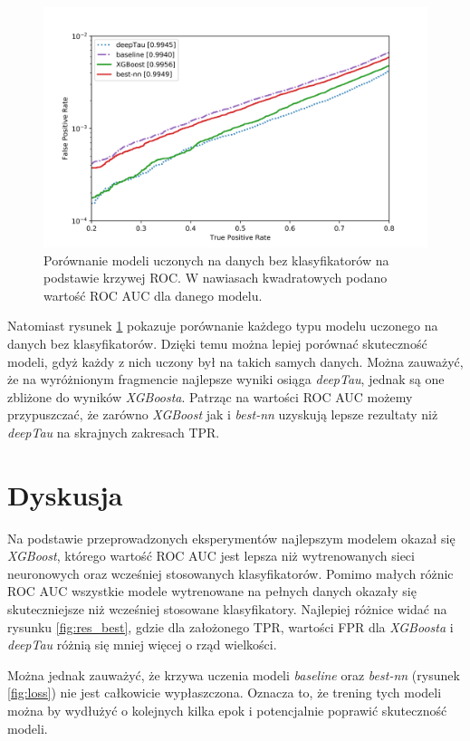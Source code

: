 \documentclass{pracalicmgr}
\begin{document}
	\begin{figure}
	\centering
	\includegraphics[width=1\textwidth]{without_disc.png}
	\caption{Porównanie modeli uczonych na danych bez klasyfikatorów na podstawie krzywej ROC. W nawiasach kwadratowych podano wartość ROC AUC dla danego modelu.}
	\label{fig:res_disc}
	\end{figure}
	
	Natomiast rysunek \ref{fig:res_disc} pokazuje porównanie każdego typu modelu uczonego na danych bez klasyfikatorów. Dzięki temu można lepiej porównać skuteczność modeli, gdyż każdy z nich uczony był na takich samych danych. Można zauważyć, że na wyróżnionym fragmencie najlepsze wyniki osiąga \textit{deepTau}, jednak są one zbliżone do wyników \textit{XGBoosta}. Patrząc na wartości ROC AUC możemy przypuszczać, że zarówno \textit{XGBoost} jak i \textit{best-nn} uzyskują lepsze rezultaty niż \textit{deepTau} na skrajnych zakresach TPR.
	
    
    \chapter{Dyskusja}
    
	Na podstawie przeprowadzonych eksperymentów najlepszym modelem okazał się \textit{XGBoost}, którego wartość ROC AUC jest lepsza niż wytrenowanych sieci neuronowych oraz wcześniej stosowanych klasyfikatorów. Pomimo małych różnic ROC AUC wszystkie modele wytrenowane na pełnych danych okazały się skuteczniejsze niż wcześniej stosowane klasyfikatory. Najlepiej różnice widać na rysunku \ref{fig:res_best}, gdzie dla założonego TPR, wartości FPR dla \textit{XGBoosta} i \textit{deepTau} różnią się mniej więcej o rząd wielkości.    
    
     Można jednak zauważyć, że krzywa uczenia modeli \textit{baseline} oraz \textit{best-nn} (rysunek \ref{fig:loss}) nie jest całkowicie wypłaszczona. Oznacza to, że trening tych modeli można by wydłużyć o kolejnych kilka epok i potencjalnie poprawić skuteczność modeli.
    
\end{document}
